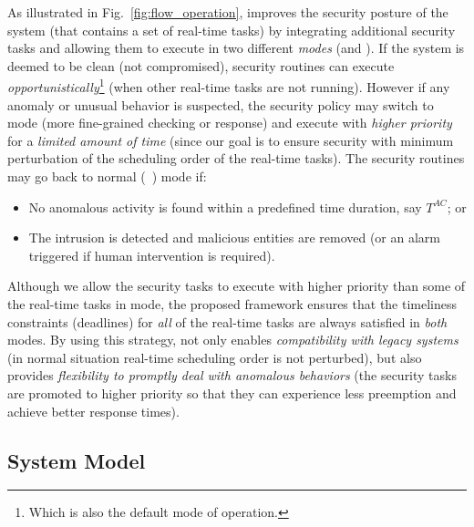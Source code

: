 \documentclass[../rt_server_main.tex]{subfiles}
\begin{document}
As illustrated in Fig.~\ref{fig:flow_operation}, \coolname improves the security posture of the system (that contains a set of real-time tasks) by integrating additional security tasks and allowing them to execute in two different \textit{modes} (\viz \pve and \ave). %
If the system is deemed to be clean (\ie not compromised), security routines can execute \textit{opportunistically}\footnote{Which is also the default mode of operation.} (\eg when other real-time tasks are not running). However if any anomaly or unusual behavior is suspected, the security policy may switch to \ave mode (\eg more fine-grained checking or response) and execute with \textit{higher priority} for a \textit{limited amount of time} (since our goal is to ensure security with minimum perturbation of the scheduling order of the real-time tasks). %
The security routines may go back to normal (\eg~\pve) mode  if: 
\begin{itemize}
\item No anomalous activity is found within a predefined time duration, say $T^{AC}$; or
\item The intrusion is detected and malicious entities are removed (or an alarm triggered if human intervention is required). 
\end{itemize}

Although we allow the security tasks to execute with higher priority than some of the real-time tasks in \ave mode, the proposed framework ensures that the timeliness constraints (\eg deadlines) for \textit{all} of the real-time tasks are always satisfied in \textit{both} modes. By using this strategy, \coolname not only enables \textit{compatibility with legacy systems} (\eg in normal situation real-time scheduling order is not perturbed), but also provides \textit{flexibility to promptly deal with anomalous behaviors} (\ie the security tasks are promoted to higher priority so that they can experience less preemption and achieve better response times).


\subsection{System Model} \label{subsec:sec_task}
\end{document}
